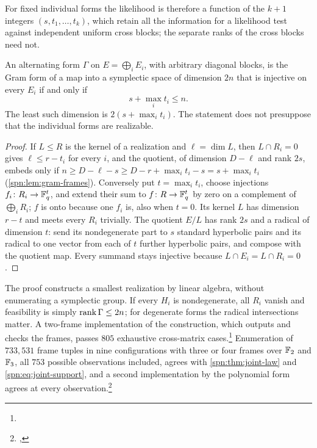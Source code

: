 For fixed individual forms the likelihood is therefore a function of the $k+1$ integers
$(s,t_1,\dots,t_k)$, which retain all the information for a likelihood test against independent
uniform cross blocks; the separate ranks of the cross blocks need not.

\begin{theorem}\label{spn:thm:joint-support}
An alternating form $\Gamma$ on $E=\bigoplus_iE_i$, with arbitrary diagonal blocks, is the Gram form
of a map into a symplectic space of dimension $2n$ that is injective on every $E_i$ if and only if
\begin{equation}\label{spn:eq:joint-support}
 s+\max_it_i\le n .
\end{equation}
The least such dimension is $2(s+\max_it_i)$. The statement does not presuppose that the individual
forms are realizable.
\end{theorem}

\begin{proof}
If $L\le R$ is the kernel of a realization and $\ell=\dim L$, then $L\cap R_i=0$ gives
$\ell\le r-t_i$ for every $i$, and the quotient, of dimension $D-\ell$ and rank $2s$, embeds only if
$n\ge D-\ell-s\ge D-r+\max_it_i-s=s+\max_it_i$ (\cref{spn:lem:gram-frames}). Conversely put
$t=\max_it_i$, choose injections $f_i\colon R_i\to\mathbb{F}_q^t$, and extend their sum to
$f\colon R\to\mathbb{F}_q^t$ by zero on a complement of $\bigoplus_iR_i$; $f$ is onto because one $f_i$ is,
also when $t=0$. Its kernel $L$ has dimension $r-t$ and meets every $R_i$ trivially. The quotient
$E/L$ has rank $2s$ and a radical of dimension $t$: send its nondegenerate part to $s$ standard
hyperbolic pairs and its radical to one vector from each of $t$ further hyperbolic pairs, and compose
with the quotient map. Every summand stays injective because $L\cap E_i=L\cap R_i=0$.
\end{proof}

The proof constructs a smallest realization by linear algebra, without enumerating a symplectic
group. If every $H_i$ is nondegenerate, all $R_i$ vanish and feasibility is simply
$\operatorname{rank}\Gamma\le2n$; for degenerate forms the radical intersections matter. A two-frame implementation
of the construction, which outputs and checks the frames, passes $805$ exhaustive cross-matrix
cases.\footnote{}
Enumeration of $733{,}531$ frame tuples in nine configurations with three or four frames over $\mathbb{F}_2$
and $\mathbb{F}_3$, all $753$ possible observations included, agrees with \cref{spn:thm:joint-law} and
\eqref{spn:eq:joint-support}, and a second implementation by the polynomial form agrees at every
observation.\footnote{\raggedright{},
}


